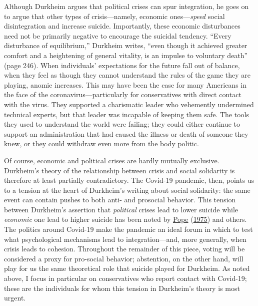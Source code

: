 \documentclass[
  12pt,
]{article}
\begin{document}
Although Durkheim argues that political crises can spur integration, he goes on to argue that other types of crisis---namely, economic ones---\emph{speed} social disintegration and increase suicide. Importantly, these economic disturbances need not be primarily negative to encourage the suicidal tendency. ``Every disturbance of equilibrium,'' Durkheim writes, ``even though it achieved greater comfort and a heightening of general vitality, is an impulse to voluntary death'' (page 246). When individuals' expectations for the future fall out of balance, when they feel as though they cannot understand the rules of the game they are playing, anomie increases. This may have been the case for many Americans in the face of the coronavirus---particularly for conservatives with direct contact with the virus. They supported a charismatic leader who vehemently undermined technical experts, but that leader was incapable of keeping them safe. The tools they used to understand the world were failing; they could either continue to support an administration that had caused the illness or death of someone they knew, or they could withdraw even more from the body politic.

Of course, economic and political crises are hardly mutually exclusive. Durkheim's theory of the relationship between crisis and social solidarity is therefore at least partially contradictory. The Covid-19 pandemic, then, points us to a tension at the heart of Durkheim's writing about social solidarity: the same event can contain pushes to both anti- and prosocial behavior. This tension between Durkheim's assertion that \emph{political} crises lead to lower suicide while \emph{economic} one lead to higher suicide has been noted by \protect\hyperlink{ref-Pope1975}{Pope} (\protect\hyperlink{ref-Pope1975}{1975}) and others. The politics around Covid-19 make the pandemic an ideal forum in which to test what psychological mechanisms lead to integration---and, more generally, when crisis leads to cohesion. Throughout the remainder of this piece, voting will be considered a proxy for pro-social behavior; abstention, on the other hand, will play for us the same theoretical role that suicide played for Durkheim. As noted above, I focus in particular on conservatives who report contact with Covid-19; these are the individuals for whom this tension in Durkheim's theory is most urgent.
\end{document}
